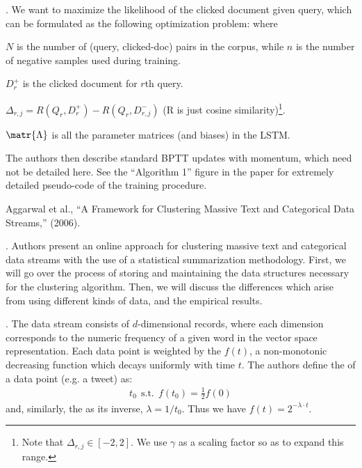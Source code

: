 \documentclass[11pt]{article}
\newcommand\myspace[1][]{\vspace{#1\bigskipamount}}
\newcommand\p{\Needspace{10\baselineskip} \noindent}
\begin{document}
\myspace
\p {}. We want to maximize the likelihood of the clicked document given query, which can be formulated as the following optimization problem:
where 
\begin{compactitem}
	\item $N$ is the number of (query, clicked-doc) pairs in the corpus, while $n$ is the number of negative samples used during training.
	\item $D_r^+$ is the clicked document for $r$th query.
	\item $\Delta_{r,j} = R(Q_r, D_r^+) - R(Q_r, D_{r,j}^-)$ (R is just cosine similarity)\footnote{
		Note that $\Delta_{r,j} \in [-2, 2]$. We use $\gamma$ as a scaling factor so as to expand this range.
		}.
	\item $\matr{\Lambda}$ is all the parameter matrices (and biases) in the LSTM. 
\end{compactitem}
The authors then describe standard BPTT updates with momentum, which need not be detailed here. See the ``Algorithm 1'' figure in the paper for extremely detailed pseudo-code of the training procedure.




\vspace{-1em}
{\footnotesize Aggarwal et al., ``A Framework for Clustering Massive Text and Categorical Data
	Streams,'' (2006).}

\p {}. Authors present an online approach for clustering massive text and categorical data streams with the use of a statistical summarization methodology. First, we will go over the process of storing and maintaining the data structures necessary for the clustering algorithm. Then, we will discuss the differences which arise from using different kinds of data, and the empirical results.

\myspace
\p {}. The data stream consists of $d$-dimensional records, where each dimension corresponds to the numeric frequency of a given word in the vector space representation. Each data point is weighted by the  $f(t)$, a non-monotonic decreasing function which decays uniformly with time $t$. The authors define the  of a data point (e.g. a tweet) as:
\begin{align}
	t_0 ~~ \text{s.t.} ~~ f(t_0) = \frac{1}{2} f(0)
\end{align}
and, similarly, the  as its inverse, $\lambda = 1/t_0$. Thus we have $f(t) = 2^{-\lambda \cdot t}$. \\
\end{document}

